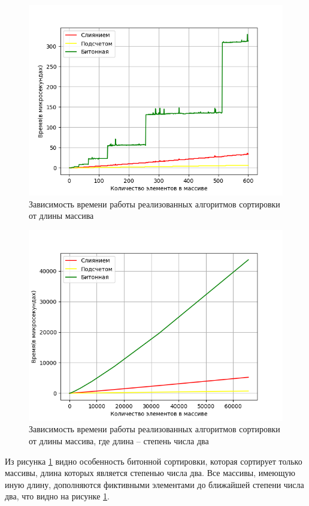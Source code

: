 \begin{figure}[h]
	\centering
	\includegraphics[width=140mm]{images/result}
	\caption{Зависимость времени работы реализованных алгоритмов сортировки от длины массива}
	\label{img:result}
\end{figure}
\begin{figure}[h]
	\centering
	\includegraphics[width=140mm]{images/resultDegree}
	\caption{Зависимость времени работы реализованных алгоритмов сортировки от длины массива, где длина -- степень числа два}
	\label{img:resultDegree}
\end{figure}

\clearpage
Из рисунка \ref{img:result} видно особенность битонной сортировки, которая сортирует только массивы, длина которых является степенью числа два. Все массивы, имеющую иную длину, дополняются фиктивными элементами до ближайшей степени числа два, что видно на рисунке \ref{img:result}. 

